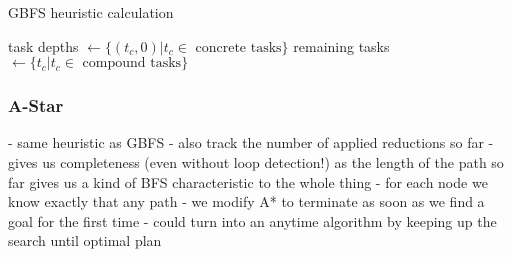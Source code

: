 \begin{algorithm}
	\caption{GBFS heuristic calculation}
	task depths $\gets \{(t_c, 0) | t_c \in \text{ concrete tasks}\}$\;
	remaining tasks $\gets \{t_c | t_c \in \text{ compound tasks}\}$\;
\end{algorithm}


\subsubsection{A-Star}
- same heuristic as GBFS
- also track the number of applied reductions so far
- gives us completeness (even without loop detection!) as the length of the path so far gives us a kind of BFS characteristic to the whole thing
- for each node we know exactly that any path
- we modify A* to terminate as soon as we find a goal for the first time
- could turn into an anytime algorithm by keeping up the search until optimal plan

